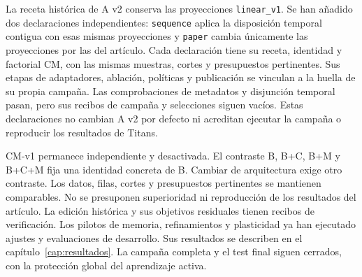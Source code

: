 \documentclass[11pt,a4paper]{report}
\begin{document}
La receta histórica de A v2 conserva las proyecciones \texttt{linear\_v1}.
Se han añadido dos declaraciones independientes: \texttt{sequence} aplica la
disposición temporal contigua con esas mismas proyecciones y \texttt{paper}
cambia únicamente las proyecciones por las del artículo. Cada declaración
tiene su receta, identidad y factorial CM, con las mismas muestras, cortes y
presupuestos pertinentes. Sus etapas de adaptadores, ablación, políticas y
publicación se vinculan a la huella de su propia campaña. Las comprobaciones
de metadatos y disjunción temporal pasan, pero sus recibos de campaña y
selecciones siguen vacíos. Estas declaraciones no cambian A v2 por defecto
ni acreditan ejecutar la campaña o reproducir los resultados de Titans.

CM-v1 permanece independiente y desactivada. El contraste B, B+C, B+M y B+C+M
fija una identidad concreta de B. Cambiar de arquitectura exige otro contraste.
Los datos, filas, cortes y presupuestos pertinentes se mantienen comparables.
No se presuponen superioridad ni reproducción de los resultados del artículo.
La edición histórica y sus objetivos residuales tienen recibos de verificación.
Los pilotos de memoria, refinamientos y plasticidad ya han ejecutado ajustes y
evaluaciones de desarrollo. Sus resultados se describen en el
capítulo~\ref{cap:resultados}. La campaña completa y el test final siguen
cerrados, con la protección global del aprendizaje activa.
\end{document}
